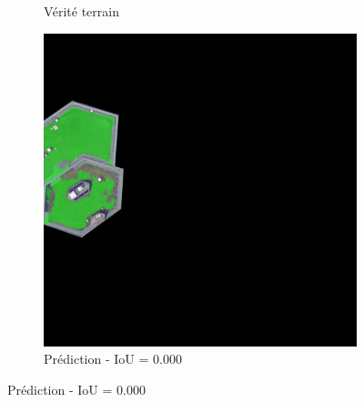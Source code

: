 \begin{figure}[H]
\begin{subfigure}{0.32\textwidth}
    \caption{Vérité terrain}
\end{subfigure}
\hfill
\begin{subfigure}{0.32\textwidth}
    \includegraphics[width=\textwidth]{02-main//figures/ch4/kfold_ensembles/unetplusplus_tu-efficientnetv2_rw_s.ra2_in1k/worst_cases/worst_3_iou0.000_25001117_tile_3_9_5ba8f7_overlay_pred.png}
    \caption{Prédiction - IoU = 0.000}
\end{subfigure}

\vspace{0.35cm}


\end{figure}
